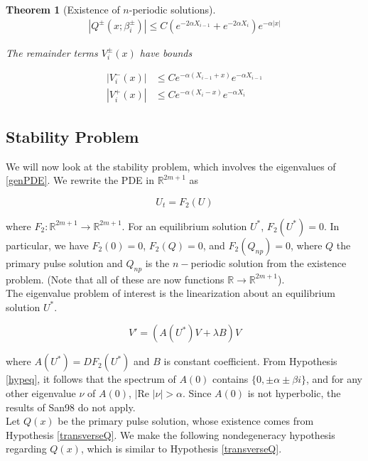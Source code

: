 \documentclass[12pt]{article}
\def\R{{\mathbb R}}
\newtheorem{theorem}{Theorem}
\begin{document}
\begin{theorem}[Existence of $n$-periodic solutions]
\begin{align*}
|Q^\pm(x; \beta_i^\pm)| \leq C (e^{-2 \alpha X_{i-1}} + e^{-2 \alpha X_i})e^{-\alpha |x|}
\end{align*} 

The remainder terms $V_i^\pm(x)$ have bounds

\begin{align}
|V_i^-(x)| &\leq C e^{-\alpha(X_{i-1} + x)}e^{-\alpha X_{i-1}} \\
|V_i^+(x)| &\leq C e^{-\alpha(X_i - x)}e^{-\alpha X_i} 
\end{align} 
\end{theorem}

\subsection{Stability Problem}

We will now look at the stability problem, which involves the eigenvalues of \eqref{genPDE}. We rewrite the PDE in $\R^{2m+1}$ as

\begin{equation}\label{PDEsystem}
U_t = F_2(U)
\end{equation}

where $F_2: \R^{2m+1} \rightarrow \R^{2m+1}$. For an equilibrium solution $U^*$, $F_2(U^*) = 0$. In particular, we have $F_2(0) = 0$, $F_2(Q) = 0$, and $F_2(Q_{np}) = 0$, where $Q$ the primary pulse solution and $Q_{np}$ is the $n-$periodic solution from the existence problem. (Note that all of these are now functions $\R \rightarrow \R^{2m+1}$).
\\

The eigenvalue problem of interest is the linearization about an equilibrium solution $U^*$.

\begin{equation}\label{PDEeig}
V' = ( A(U^*)V + \lambda B)V 
\end{equation}

where $A(U^*) = DF_2(U^*)$ and $B$ is constant coefficient. From Hypothesis \ref{hypeq}, it follows that the spectrum of $A(0)$ contains $\{ 0, \pm \alpha \pm \beta i\}$, and for any other eigenvalue $\nu$ of $A(0)$, $|\text{Re }|\nu| > \alpha$. Since $A(0)$ is not hyperbolic, the results of San98 do not apply.\\

Let $Q(x)$ be the primary pulse solution, whose existence comes from Hypothesis \ref{transverseQ}. We make the following nondegeneracy hypothesis regarding $Q(x)$, which is similar to Hypothesis \ref{transverseQ}.
\end{document}
